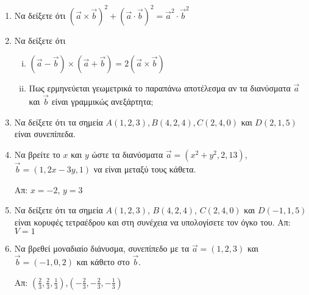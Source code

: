 \begin{enumerate}[itemsep=0.7\baselineskip]
  \item Να δείξετε ότι $ (\vec{a}\times \vec{b})^{2} + (\vec{a}\cdot \vec{b})^{2} =
    \vec{a}^{2}\cdot \vec{b}^{2} $  

  \item Να δείξετε ότι
    \begin{enumerate}[i)]
      \item $ ( \vec{a} - \vec{b} ) \times ( \vec{a} + \vec{b} ) = 2 (\vec{a} \times 
        \vec{b}) $
      \item Πως ερμηνεύεται γεωμετρικά το παραπάνω αποτέλεσμα αν τα διανύσματα 
        $ \vec{a} $ και $ \vec{b} $ είναι γραμμικώς ανεξάρτητα;
    \end{enumerate}


  \item Να δείξετε ότι τα σημεία $ A(1,2,3), B(4,2,4), C(2,4,0) $ και $ D(2,1,5) $ 
    είναι συνεπίπεδα.

  \item Να βρείτε το $x$ και $y$ ώστε τα διανύσματα $ \vec{a} = (x^{2}+y^{2},2,13) $, 
    $ \vec{b} = (1,2x-3y,1) $ να είναι μεταξύ τους κάθετα. 

    \hfill Απ: $ x=-2 $, $ y=3 $

  \item Να δείξετε ότι τα σημεία $ A(1,2,3) $, $ B(4,2,4) $, $ C(2,4,0) $ και 
    $ D(-1,1,5) $ είναι κορυφές τετραέδρου και στη συνέχεια να υπολογίσετε τον όγκο του.
    \hfill Απ: $ V=1 $

  \item Να βρεθεί μοναδιαίο διάνυσμα, συνεπίπεδο με τα $ \vec{a} = (1,2,3) $ και 
    $ \vec{b} = (-1,0,2) $ και κάθετο στο $ \vec{b} $.

    \hfill Απ: $ (\frac{2}{3}, \frac{2}{3}, \frac{1}{3}) $,$ (-\frac{2}{3},- 
    \frac{2}{3}, -\frac{1}{3})$  
\end{enumerate}



